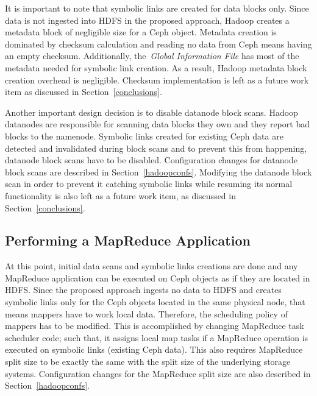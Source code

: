 It is important to note that symbolic links are created for data blocks only. Since data is not ingested
into HDFS in the proposed approach, Hadoop creates a metadata block of negligible size for a Ceph object.
Metadata creation is dominated by checksum calculation and reading no data from Ceph means having an empty
checksum. Additionally, the~\textit{Global Information File} has most of the metadata needed for symbolic link
creation. As a result, Hadoop metadata block creation overhead is negligible. Checksum implementation is left
as a future work item as discussed in Section~\ref{conclusions}.

Another important design decision is to disable datanode
block scans. Hadoop datanodes are responsible for scanning data blocks they own and they report bad
blocks to the namenode. Symbolic links created for existing Ceph data are detected and invalidated during block scans
and to prevent this from happening, datanode block scans have to be disabled. Configuration changes for
datanode block scans are described in Section~\ref{hadoopconfs}. Modifying the datanode block scan in order to
prevent it catching symbolic links while resuming its normal functionality is also left as a future work item,
as discussed in Section~\ref{conclusions}.

\subsection{Performing a MapReduce Application}
At this point, initial data scans and symbolic links creations are done and any MapReduce application can be executed
on Ceph objects as if they are located in HDFS. Since the proposed approach ingests no data to HDFS and creates
symbolic links only for the Ceph objects located in the same physical node, that means mappers have to work local
data. Therefore, the scheduling policy of mappers has to be modified. This is accomplished by changing
MapReduce task scheduler code; such that, it assigns local map tasks if a MapReduce operation is executed on
symbolic links (existing Ceph data). This also requires MapReduce split size to be exactly the same with the split
size of the underlying storage systems. Configuration changes for the MapReduce split size are also described in
Section~\ref{hadoopconfs}.
